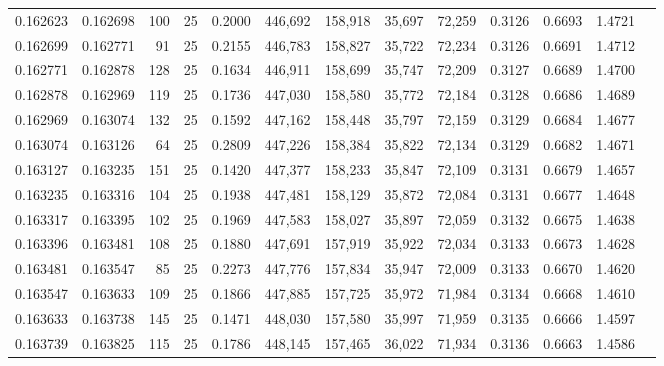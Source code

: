 \begin{tabular}{rrrrrrrrrrrrr}
0.162623 & 0.162698 &   100 &  25 &                                     0.2000 & 446,692 & 158,918 &  35,697 &  72,259 & 0.3126 & 0.6693 & 1.4721 \\
0.162699 & 0.162771 &    91 &  25 &                                     0.2155 & 446,783 & 158,827 &  35,722 &  72,234 & 0.3126 & 0.6691 & 1.4712 \\
0.162771 & 0.162878 &   128 &  25 &                                     0.1634 & 446,911 & 158,699 &  35,747 &  72,209 & 0.3127 & 0.6689 & 1.4700 \\
0.162878 & 0.162969 &   119 &  25 &                                     0.1736 & 447,030 & 158,580 &  35,772 &  72,184 & 0.3128 & 0.6686 & 1.4689 \\
0.162969 & 0.163074 &   132 &  25 &                                     0.1592 & 447,162 & 158,448 &  35,797 &  72,159 & 0.3129 & 0.6684 & 1.4677 \\
0.163074 & 0.163126 &    64 &  25 &                                     0.2809 & 447,226 & 158,384 &  35,822 &  72,134 & 0.3129 & 0.6682 & 1.4671 \\
0.163127 & 0.163235 &   151 &  25 &                                     0.1420 & 447,377 & 158,233 &  35,847 &  72,109 & 0.3131 & 0.6679 & 1.4657 \\
0.163235 & 0.163316 &   104 &  25 &                                     0.1938 & 447,481 & 158,129 &  35,872 &  72,084 & 0.3131 & 0.6677 & 1.4648 \\
0.163317 & 0.163395 &   102 &  25 &                                     0.1969 & 447,583 & 158,027 &  35,897 &  72,059 & 0.3132 & 0.6675 & 1.4638 \\
0.163396 & 0.163481 &   108 &  25 &                                     0.1880 & 447,691 & 157,919 &  35,922 &  72,034 & 0.3133 & 0.6673 & 1.4628 \\
0.163481 & 0.163547 &    85 &  25 &                                     0.2273 & 447,776 & 157,834 &  35,947 &  72,009 & 0.3133 & 0.6670 & 1.4620 \\
0.163547 & 0.163633 &   109 &  25 &                                     0.1866 & 447,885 & 157,725 &  35,972 &  71,984 & 0.3134 & 0.6668 & 1.4610 \\
0.163633 & 0.163738 &   145 &  25 &                                     0.1471 & 448,030 & 157,580 &  35,997 &  71,959 & 0.3135 & 0.6666 & 1.4597 \\
0.163739 & 0.163825 &   115 &  25 &                                     0.1786 & 448,145 & 157,465 &  36,022 &  71,934 & 0.3136 & 0.6663 & 1.4586 \\

\end{tabular}
